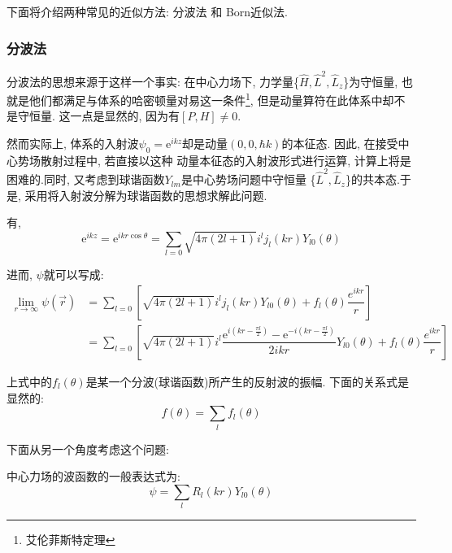 \documentclass[a4paper, 11pt]{article}
\begin{document}
\begin{spacing}{1.2}
          下面将介绍两种常见的近似方法: 分波法 和 Born近似法. 
        
        \subsubsection{分波法}
          分波法的思想来源于这样一个事实: 在中心力场下, 力学量\{$\hat{H}, \hat{L}^2, \hat{L}_z$\}为守恒量, 
          也就是他们都满足与体系的哈密顿量对易这一条件\footnote{艾伦菲斯特定理}, 但是动量算符在此体系中却不是守恒量.
          这一点是显然的, 因为有$[P,H]\ne0$. 

          然而实际上, 体系的入射波$\psi_0 = \mathrm{e}^{ikz}$却是动量$(0,0,\hbar{}k)$的本征态.
          因此, 在接受中心势场散射过程中, 若直接以这种
          动量本征态的入射波形式进行运算, 计算上将是困难的.同时, 又考虑到球谐函数$Y_{lm}$是中心势场问题中守恒量
          \{$\hat{L}^2, \hat{L}_z$\}的共本态.于是, 采用将入射波分解为球谐函数的思想求解此问题.
          
          有,
          \begin{equation}
            \mathrm{e}^{ikz} = \mathrm{e}^{ikr\cos\theta} = %
            \sum_{l=0}\sqrt{4\pi(2l+1)}i^lj_l(kr)Y_{l0}(\theta)
          \end{equation}

          进而, $\psi$就可以写成:  
          \begin{equation}
            \label{fbf:1}
            \begin{aligned}
              \lim_{r\to\infty}\psi(\vec{r}) &= \sum_{l=0}\left[%
              \sqrt{4\pi(2l+1)}i^lj_l(kr)Y_{l0}(\theta)+f_l(\theta)\dfrac{e^{ikr}}{r}\right]\\
              &= \sum_{l=0}\left[\sqrt{4\pi(2l+1)}i^l\dfrac{\mathrm{e}^{i(kr-\frac{\pi{}l}{2})}%
              -\mathrm{e}^{-i(kr-\frac{\pi{}l}{2})}}{2ikr}Y_{l0}(\theta)+f_l(\theta)%
              \dfrac{e^{ikr}}{r}\right]
            \end{aligned}
          \end{equation}

          上式中的$f_l(\theta)$是某一个分波(球谐函数)所产生的反射波的振幅. 下面的关系式是显然的:
          \begin{equation}
            \label{fbf:3}
            f(\theta) = \sum_{l}f_l(\theta)
          \end{equation}

          下面从另一个角度考虑这个问题:

          中心力场的波函数的一般表达式为:
          \begin{equation}
            \psi = \sum_l R_l(kr)Y_{l0}(\theta)
          \end{equation}


\end{spacing}
\end{document}
